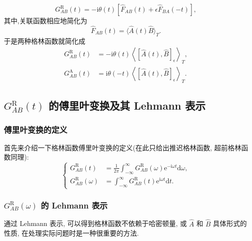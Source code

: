 \begin{equation}
    G_{AB}^{\mathrm{R}}(t)=-\mathrm{i}\theta(t)\left[ \hat F_{AB}(t)+\epsilon \hat F_{BA}(-t) \right],
\end{equation}
其中,关联函数相应地简化为
\begin{equation}
    \hat{F}_{AB}(t)=\langle \hat{A}(t)\hat{B} \rangle_T.
\end{equation}
于是两种格林函数就简化成
    \begin{align}
        G_{AB}^{\mathrm{R}}(t)&=-\mathrm{i}\theta(t)\left\langle \left[ \hat A(t),\hat B \right]_\epsilon \right\rangle_T,\\
        G_{AB}^{\mathrm{A}}(t)&=\mathrm{i}\theta(-t)\left\langle \left[ \hat A(t),\hat B \right]_\epsilon \right\rangle_T.
    \end{align}

\subsection{$G_{AB}^{\mathrm{R}}(t)$ 的傅里叶变换及其 Lehmann 表示}
\subsubsection{傅里叶变换的定义}
首先来介绍一下格林函数傅里叶变换的定义(在此只给出推迟格林函数, 超前格林函数同理):
\begin{equation}
    \left\{  
        \begin{aligned}
            G_{AB}^{\mathrm{R}}(t)&=\frac{1}{2\pi}\int_{-\infty}^\infty G_{AB}^{\mathrm{R}}(\omega)\mathrm{e}^{-\mathrm{i}\omega t}\mathrm{d}\omega,\\
            G_{AB}^{\mathrm{R}}(\omega)&=\int_{-\infty}^\infty G_{AB}^{\mathrm{R}}(t)\mathrm{e}^{\mathrm{i}\omega t}\mathrm{d}t.
        \end{aligned}
    \right.
\end{equation}
\subsubsection{$G_{AB}^{\mathrm{R}}(\omega)$ 的 Lehmann 表示}
通过 Lehmann 表示, 可以得到格林函数不依赖于哈密顿量, 或 $\hat{A}$ 和 $\hat B$ 具体形式的性质, 在处理实际问题时是一种很重要的方法.

